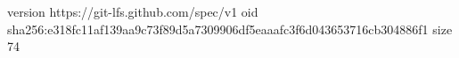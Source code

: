 version https://git-lfs.github.com/spec/v1
oid sha256:e318fc11af139aa9c73f89d5a7309906df5eaaafc3f6d043653716cb304886f1
size 74
